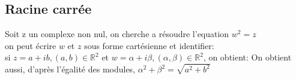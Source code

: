 \subsection{Racine carr\'ee}
Soit z un complexe non nul, on cherche a r\'esoudre l'equation $w^2=z$ \\
on peut \'ecrire $w$ et $z$ sous forme cart\'esienne et identifier:\\
si $z=a+ib, (a,b) \in \mathbb{R}^2$ et $w = \alpha + i\beta, (\alpha, \beta) \in \mathbb{R}^2$, on obtient:
On obtient aussi, d'apr\`es l'\'egalit\'e des modules, $\alpha^2+\beta^2=\sqrt{a^2+b^2}$
